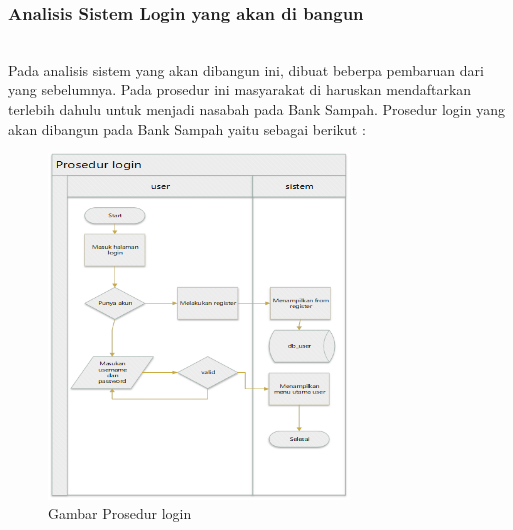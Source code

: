 \subsubsection{Analisis Sistem Login yang akan di bangun}
\hfill\\
Pada analisis sistem yang akan dibangun ini, dibuat beberpa pembaruan dari yang  sebelumnya. Pada prosedur ini masyarakat di haruskan mendaftarkan terlebih dahulu untuk menjadi nasabah pada Bank Sampah. Prosedur login yang akan dibangun pada Bank Sampah yaitu sebagai berikut :
	\begin{figure}[H]
		\includegraphics[width=8cm]{figures/analisis/3.png}
		\centering
		\caption{Gambar Prosedur login}
	\end{figure}
	
